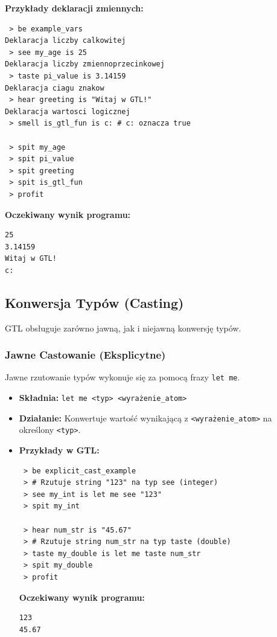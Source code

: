 \documentclass[12pt,a4paper]{article}
\begin{document}
\textbf{Przykłady deklaracji zmiennych:}
\begin{lstlisting}
 > be example_vars
Deklaracja liczby calkowitej
 > see my_age is 25
Deklaracja liczby zmiennoprzecinkowej
 > taste pi_value is 3.14159
Deklaracja ciagu znakow
 > hear greeting is "Witaj w GTL!"
Deklaracja wartosci logicznej
 > smell is_gtl_fun is c: # c: oznacza true

 > spit my_age
 > spit pi_value
 > spit greeting
 > spit is_gtl_fun
 > profit
\end{lstlisting}
\textbf{Oczekiwany wynik programu:}
\begin{verbatim}
25
3.14159
Witaj w GTL!
c:
\end{verbatim}

\subsection{Konwersja Typów (Casting)}
\label{ssec:casting}
GTL obsługuje zarówno jawną, jak i niejawną konwersję typów.

\subsubsection{Jawne Castowanie (Eksplicytne)}
Jawne rzutowanie typów wykonuje się za pomocą frazy \texttt{let me}.
\begin{itemize}
    \item \textbf{Składnia:} \texttt{let me <typ> <wyrażenie\_atom>}
    \item \textbf{Działanie:} Konwertuje wartość wynikającą z \texttt{<wyrażenie\_atom>} na określony \texttt{<typ>}.
    \item \textbf{Przykłady w GTL:}
    \begin{lstlisting}
 > be explicit_cast_example
 > # Rzutuje string "123" na typ see (integer)
 > see my_int is let me see "123"
 > spit my_int

 > hear num_str is "45.67"
 > # Rzutuje string num_str na typ taste (double)
 > taste my_double is let me taste num_str
 > spit my_double
 > profit
    \end{lstlisting}
    \textbf{Oczekiwany wynik programu:}
    \begin{verbatim}
123
45.67
    \end{verbatim}
\end{itemize}
\end{document}
